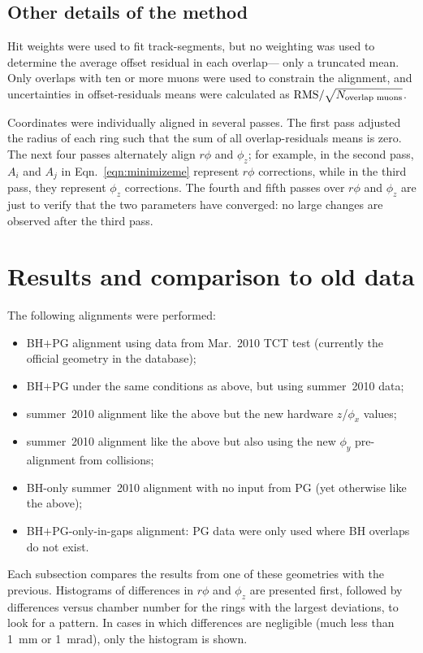 \documentclass[12pt]{article}
\newcommand{\s}[1]{{\mbox{\scriptsize #1}}}
\begin{document}
\subsection{Other details of the method}

Hit weights were used to fit track-segments, but no weighting was used
to determine the average offset residual in each overlap--- only a
truncated mean.  Only overlaps with ten or more muons were used to
constrain the alignment, and uncertainties in offset-residuals means
were calculated as $\mbox{RMS}/\sqrt{N_\s{overlap muons}}$.

Coordinates were individually aligned in several passes.  The first
pass adjusted the radius of each ring such that the sum of all
overlap-residuals means is zero.  The next four passes alternately
align $r\phi$ and $\phi_z$; for example, in the second pass, $A_i$ and
$A_j$ in Eqn.~\ref{eqn:minimizeme} represent $r\phi$ corrections,
while in the third pass, they represent $\phi_z$ corrections.  The
fourth and fifth passes over $r\phi$ and $\phi_z$ are just to verify
that the two parameters have converged: no large changes are observed
after the third pass.

\section{Results and comparison to old data}

The following alignments were performed:
\begin{itemize}
\item BH$+$PG alignment using data from Mar.~2010 TCT test (currently
  the official geometry in the database);
\item BH$+$PG under the same conditions as above, but using
  summer~2010 data;
\item summer~2010 alignment like the above but the new hardware
  $z$/$\phi_x$ values;
\item summer~2010 alignment like the above but also using the new
  $\phi_y$ pre-alignment from collisions;
\item BH-only summer~2010 alignment with no input from PG (yet
  otherwise like the above);
\item BH$+$PG-only-in-gaps alignment: PG data were only used where BH
  overlaps do not exist.
\end{itemize}
Each subsection compares the results from one of these geometries with
the previous.  Histograms of differences in $r\phi$ and $\phi_z$ are
presented first, followed by differences versus chamber number for the
rings with the largest deviations, to look for a pattern.  In cases in
which differences are negligible (much less than 1~mm or 1~mrad),
only the histogram is shown.
\end{document}
